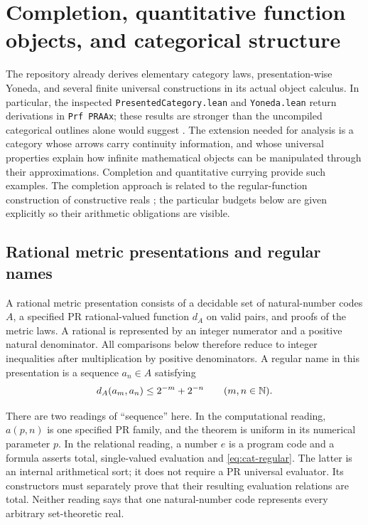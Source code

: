 \section{Completion, quantitative function objects, and categorical structure}
\label{sec:categorical-completion}

The repository already derives elementary category laws, presentation-wise
Yoneda, and several finite universal constructions in its actual object
calculus. In particular, the inspected \texttt{PresentedCategory.lean} and
\texttt{Yoneda.lean} return derivations in \texttt{Prf PRAAx}; these results
are stronger than the uncompiled categorical outlines alone would suggest
\cite{repo-presented,repo-yoneda}. The extension needed for analysis is a
category whose arrows carry continuity information, and whose universal
properties explain how infinite mathematical objects can be manipulated
through their approximations. Completion and quantitative currying provide
such examples. The completion approach is related to the regular-function
construction of constructive reals \cite{oconnor2007}; the particular budgets
below are given explicitly so their arithmetic obligations are visible.

\subsection{Rational metric presentations and regular names}

\begin{definition}
A rational metric presentation consists of a decidable set of natural-number
codes $A$, a specified PR rational-valued function $d_A$ on valid pairs, and
proofs of the metric laws. A rational is represented by an integer numerator
and a positive natural denominator. All comparisons below therefore reduce
to integer inequalities after multiplication by positive denominators.
A regular name in this presentation is a sequence $a_n\in A$ satisfying
\begin{equation}
 d_A(a_m,a_n)\leq 2^{-m}+2^{-n}\qquad(m,n\in\mathbb N).
 \label{eq:cat-regular}
\end{equation}
\end{definition}

There are two readings of ``sequence'' here. In the computational reading,
$a(p,n)$ is one specified PR family, and the theorem is uniform in its
numerical parameter $p$. In the relational reading, a number $e$ is a program
code and a formula asserts total, single-valued evaluation and
\eqref{eq:cat-regular}. The latter is an internal arithmetical sort; it does
not require a PR universal evaluator. Its constructors must separately prove
that their resulting evaluation relations are total. Neither reading says
that one natural-number code represents every arbitrary set-theoretic real.

